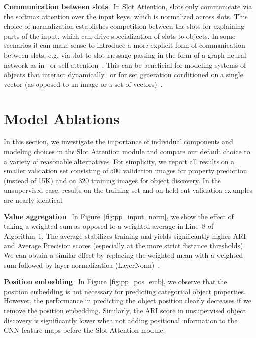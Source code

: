 \documentclass{article}
\begin{document}
\textbf{Communication between slots} \ In Slot Attention, slots only communicate via the softmax attention over the input keys, which is normalized across slots. This choice of normalization establishes competition between the slots for explaining parts of the input, which can drive specialization of slots to objects. In some scenarios it can make sense to introduce a more explicit form of communication between slots, e.g. via slot-to-slot message passing in the form of a graph neural network as in~\citep{watters2017visual,kipf2019contrastive} or self-attention~\citep{vaswani2017attention,lee2018set,santoro2018relational,goyal2019recurrent,kosiorek2020conditional}. This can be beneficial for modeling systems of objects that interact dynamically~\citep{watters2017visual,kipf2019contrastive,goyal2019recurrent} or for set generation conditioned on a single vector (as opposed to an image or a set of vectors)~\citep{kosiorek2020conditional}.

\section{Model Ablations}\label{app:ablations}
In this section, we investigate the importance of individual components and modeling choices in the Slot Attention module and compare our default choice to a variety of reasonable alternatives. For simplicity, we report all results on a smaller validation set consisting of $500$ validation images for property prediction (instead of 15K) and on $320$ training images for object discovery. In the unsupervised case, results on the training set and on held-out validation examples are nearly identical.

\textbf{Value aggregation} \ In Figure~\ref{fig:pp_input_norm}, we show the effect of taking a weighted sum as opposed to a weighted average in Line~8 of Algorithm~1. The average stabilizes training and yields significantly higher ARI and Average Precision scores (especially at the more strict distance thresholds). We can obtain a similar effect by replacing the weighted mean with a weighted sum followed by layer normalization (LayerNorm)~\citep{ba2016layer}.

\textbf{Position embedding} \ In Figure~\ref{fig:pp_pos_emb}, we observe that the position embedding is not necessary for predicting categorical object properties. However, the performance in predicting the object position clearly decreases if we remove the position embedding. Similarly, the ARI score in unsupervised object discovery is significantly lower when not adding positional information to the CNN feature maps before the Slot Attention module.
\end{document}

